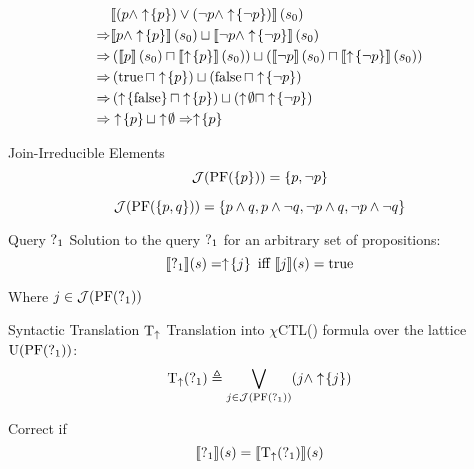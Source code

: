 \begin{frame}[t]
  \begin{align*}
    &\llbracket \left(p \land \upclos{p}\right) \lor 
      \left(\lnot p \land \upclos{\lnot p}\right) \rrbracket \left(s_0\right) \\
    \Rightarrow &\llbracket p \land \upclos{p} \rrbracket \left(s_0\right) \sqcup 
      \llbracket \lnot p \land \upclos{\lnot p} \rrbracket \left(s_0\right) \\
    \Rightarrow &\left(\llbracket p \rrbracket \left(s_0\right) \sqcap 
        \llbracket \upclos{p} \rrbracket \left(s_0\right)\right) \sqcup 
      \left(\llbracket \lnot p \rrbracket \left(s_0\right) \sqcap 
        \llbracket \upclos{\lnot p} \rrbracket \left(s_0\right)\right) \\
    \Rightarrow &\left(\true \sqcap \upclos{p}\right) \sqcup 
      \left(\false \sqcap \upclos{\lnot p}\right) \\
    \Rightarrow &\left(\upclos{\false} \sqcap \upclos{p}\right) \sqcup 
      \left(\uparrow\!\emptyset\sqcap \upclos{\lnot p}\right) \\
    \Rightarrow &\upclos{p} \sqcup \uparrow\!\emptyset
    \Rightarrow \upclos{p}
  \end{align*}
\end{frame}

\begin{frame}{Join-Irreducible Elements}
  \[ 
    \mathcal{J}(\operatorname{PF}(\{p\})) = \{ p, \lnot p \} 
  \]
  
  \[ 
    \mathcal{J}(\operatorname{PF}(\{p,q\})) = \{ p \land q, p \land \lnot q, 
                            \lnot p \land q, \lnot p \land \lnot q \} 
  \]
\end{frame}

\begin{frame}{Query $\operatorname{?}_1$}
  Solution to the query $\operatorname{?}_1$ for an arbitrary set of propositions:
  \[ \llbracket \operatorname{?}_1 \rrbracket (s) = \uparrow \! \left\{ j \right\} \text{ iff } \llbracket j \rrbracket (s) = \operatorname{true}
  \]
  
  Where $j\in\mathcal{J}(\operatorname{PF}(\operatorname{?}_1))$
\end{frame}

\begin{frame}{Syntactic Translation $\operatorname{T}_\uparrow$}
  Translation into $\chi$CTL(\mcL) formula over the lattice $\operatorname{U}(\operatorname{PF}(\operatorname{?}_1))$:
  \[ 
    \operatorname{T}_\uparrow(\operatorname{?}_1) \triangleq \bigvee_{j\in\mathcal{J}(\operatorname{PF}(\operatorname{?}_1))} (j \land \uparrow \! \left\{ j \right\})
  \]
  
  Correct if
  \[
    \llbracket \operatorname{?}_1 \rrbracket (s) = \llbracket \operatorname{T}_\uparrow(\operatorname{?}_1) \rrbracket (s)
  \]
\end{frame}

